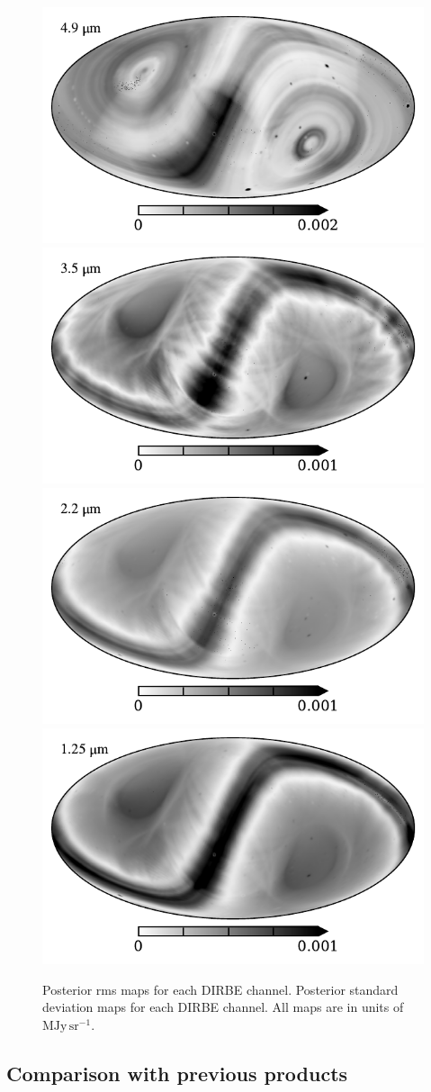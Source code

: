\documentclass{aa}
\begin{document}
\begin{figure}
  \includegraphics[width=0.39\linewidth]{figs/std_04.pdf}         
  \includegraphics[width=0.39\linewidth]{figs/std_03.pdf}\\
  \includegraphics[width=0.39\linewidth]{figs/std_02.pdf}
  \includegraphics[width=0.39\linewidth]{figs/std_01.pdf}       
  \caption{Posterior rms maps for each DIRBE channel.  Posterior standard deviation maps for each DIRBE channel. All maps are in units of $\mathrm{MJy\,sr^{-1}}$.}
  \label{fig:rms}
\end{figure}






\subsection{Comparison with previous products}


\end{document}
